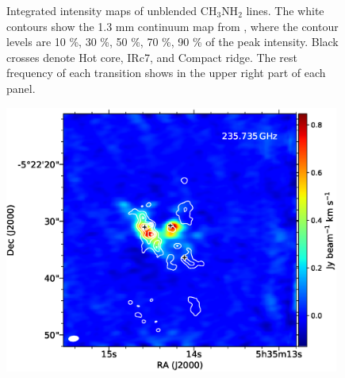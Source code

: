 \begin{figure}[H]
\begin{center}
\caption{Integrated intensity maps of unblended CH$_{3}$NH$_{2}$ lines. 
The white contours show the 1.3 mm continuum map from \citet{Hirota+2015},
where the contour levels are 10 \%, 30 \%, 50 \%, 70 \%, 90 \% of the peak intensity.
Black crosses denote Hot core, IRc7, and Compact ridge. 
The rest frequency of each transition shows in the upper right part of each panel.}
\end{center}
\end{figure}

\newpage

\begin{figure}[H] 
\begin{center}
\begin{minipage}{0.98\textwidth} 
\begin{center}
\begin{minipage}{0.48\textwidth}
\begin{center}
\includegraphics[width=0.98\textwidth]{OrionKL/mom0/235.735mom0_3-7.eps}
\end{center}
\end{minipage}
\begin{minipage}{0.48\textwidth}
\begin{center}

\end{center}
\end{minipage}
\end{center}
\end{minipage}
\end{center}
\end{figure}
